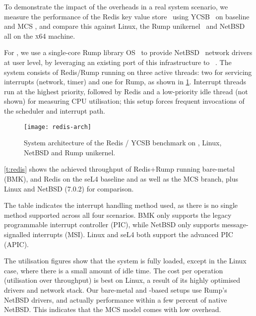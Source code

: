 To demonstrate the impact of the overheads in a real system scenario, 
we measure the performance of the Redis key value store~\citep{redis:url} using 
\gls{YCSB}~\citep{Cooper_STRS_10} on baseline and MCS \selfour, and compare this
against Linux, the Rump unikernel~\citep{Kantee_Cormack_14} and 
NetBSD~\citep{NetBSD:url} all on the \textsc{x64} machine.

For \selfour, we use a single-core Rump library OS~\citep{Kantee_Cormack_14} to provide 
NetBSD~\citep{NetBSD:url} network drivers at user level, by leveraging an existing port of this infrastructure
to \selfour~\citep{McCleod:be}.
The system consists of Redis/Rump running on three active \selfour threads: 
two for servicing interrupts (network, timer) and one for Rump, as shown in
\cref{f:redis-arch}. Interrupt threads run at the highest priority,
followed by Redis and a low-priority idle thread (not shown) for measuring CPU utilisation;
this setup forces frequent invocations of the scheduler and interrupt path.

 \begin{figure}[ht]
    \centering
    \texttt{[image: redis-arch]}
    \caption{System architecture of the Redis / \gls{YCSB} benchmark on \selfour, 
        Linux, NetBSD and Rump unikernel.}
    \label{f:redis-arch}
\end{figure}

\autoref{t:redis} shows the achieved throughput of Redis+Rump
running  bare-metal (BMK), and Redis on the seL4 baseline and as well as the MCS
branch, plus Linux and NetBSD (7.0.2) for comparison.

The table indicates the interrupt handling method used, as there is no single method supported
across all four scenarios. BMK only supports the legacy
programmable interrupt controller (PIC),
while NetBSD only supports message-signalled interrupts (MSI). Linux and seL4 both support the
advanced PIC (APIC).


The utilisation figures show that the system is fully loaded, except
in the Linux case, where there is a small amount of idle time. The
cost per operation (utilisation over throughput) is best on Linux, a
result of its highly optimised drivers and network stack. Our
bare-metal and \selfour-based setups use Rump's NetBSD drivers, and
actually performance within a few percent of native NetBSD. This
indicates that the MCS model comes with low overhead.

